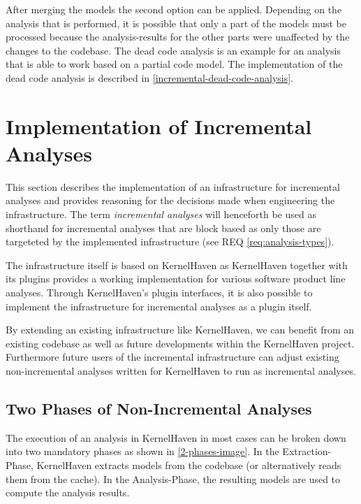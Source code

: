 \documentclass[a4paper]{article}
\begin{document}
After merging the models the second option can be applied. Depending on the analysis that is performed, it is possible that only a part of the models must be processed because the analysis-results for the other parts were unaffected by the changes to the codebase. The dead code analysis is an example for an analysis that is able to work based on a partial code model. The implementation of the dead code analysis is described in \autoref{incremental-dead-code-analysis}.


\clearpage


\section{Implementation of Incremental Analyses}\label{implementation}

This section describes the implementation of an infrastructure for incremental analyses and provides reasoning for the decisions made when engineering the infrastructure. The term \emph{incremental analyses} will henceforth be used as shorthand for incremental analyses that are block based as only those are targeteted by the implemented infrastructure (see REQ \ref{req:analysis-types}).

The infrastructure itself is based on KernelHaven \cite{KroeherEl-SharkawySchmid18} as KernelHaven together with its plugins provides a working implementation for various software product line analyses. Through KernelHaven's plugin interfaces, it is also possible to implement the infrastructure for incremental analyses as a plugin itself.

By extending an existing infrastructure like KernelHaven, we can benefit from an existing codebase as well as future developments within the KernelHaven project. Furthermore future users of the incremental infrastructure can adjust existing non-incremental analyses written for KernelHaven to run as incremental analyses.

\subsection{Two Phases of Non-Incremental Analyses}\label{2-phases}

The execution of an analysis in KernelHaven in most cases can be broken down into two mandatory phases as shown in \autoref{2-phases-image}. In the Extraction-Phase, KernelHaven extracts models from the codebase  (or alternatively reads them from the cache). In the Analysis-Phase, the resulting models are used to compute the analysis results.
\end{document}
